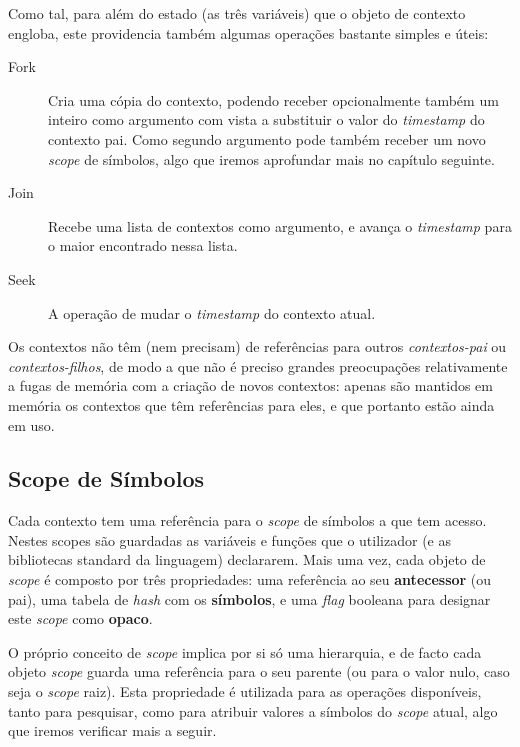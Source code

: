  Como tal, para além do estado (as três variáveis) que o objeto de contexto engloba, este providencia também algumas operações bastante simples e úteis:
 
 \begin{description}
  \item[Fork] Cria uma cópia do contexto, podendo receber opcionalmente também um inteiro como argumento com vista a substituir o valor do \textit{timestamp} do contexto pai. Como segundo argumento pode também receber um novo \textit{scope} de símbolos, algo que iremos aprofundar mais no capítulo seguinte.
  \item[Join] Recebe uma lista de contextos como argumento, e avança o \textit{timestamp} para o maior encontrado nessa lista.
  \item[Seek] A operação de mudar o \textit{timestamp} do contexto atual.
 \end{description}

 Os contextos não têm (nem precisam) de referências para outros \textit{contextos-pai} ou \textit{contextos-filhos}, de modo a que não é preciso grandes preocupações relativamente a fugas de memória com a criação de novos contextos: apenas são mantidos em memória os contextos que têm referências para eles, e que portanto estão ainda em uso.

\subsection{Scope de Símbolos}
Cada contexto tem uma referência para o \textit{scope} de símbolos a que tem acesso. Nestes scopes são guardadas as variáveis e funções que o utilizador (e as bibliotecas standard da linguagem) declararem. Mais uma vez, cada objeto de \textit{scope} é composto por três propriedades: uma referência ao seu \textbf{antecessor} (ou pai), uma tabela de \textit{hash} com os \textbf{símbolos}, e uma \textit{flag} booleana para designar este \textit{scope} como \textbf{opaco}.

O próprio conceito de \textit{scope} implica por si só uma hierarquia, e de facto cada objeto \textit{scope} guarda uma referência para o seu parente (ou para o valor nulo, caso seja o \textit{scope} raiz). Esta propriedade é utilizada para as operações disponíveis, tanto para pesquisar, como para atribuir valores a símbolos do \textit{scope} atual, algo que iremos verificar mais a seguir.

